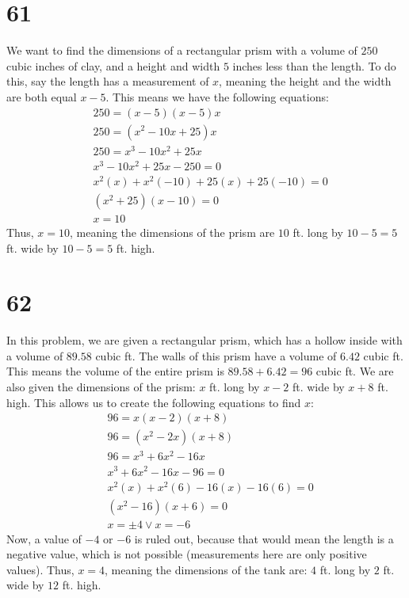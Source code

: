 \documentclass{article}
\theoremstyle{definition}
\begin{document}
\section*{61}


We want to find the dimensions of a rectangular prism with a volume of $250$ cubic inches of clay, and a height and width $5$ inches less than the length. To do this, 
say the length has a measurement of $x$, meaning the height and the width are both equal $x-5$. This means we have the following equations:
\[
\begin{array}{rl}
	& 250=(x-5)(x-5)x \\
	& 250=(x^2-10x+25)x \\
	& 250=x^3-10x^2+25x \\
	& x^3-10x^2+25x-250=0 \\
	& x^2(x)+x^2(-10)+25(x)+25(-10)=0 \\
	& (x^2+25)(x-10)=0 \\
	& x=10
\end{array}
\]
Thus, $x=10$, meaning the dimensions of the prism are $10$ ft. long by $10-5=5$ ft. wide by $10-5=5$ ft. high.

\section*{62}


In this problem, we are given a rectangular prism, which has a hollow inside with a volume of $89.58$ cubic ft. The walls of this prism have a volume of $6.42$ cubic ft. 
This means the volume of the entire prism is $89.58+6.42=96$ cubic ft. We are also given the dimensions of the prism: $x$ ft. long by $x-2$ ft. wide by $x+8$ ft. high. 
This allows us to create the following equations to find $x$:
\[
\begin{array}{rl}
	& 96=x(x-2)(x+8) \\
	& 96=(x^2-2x)(x+8) \\
	& 96=x^3+6x^2-16x \\
	& x^3+6x^2-16x-96=0 \\
	& x^2(x)+x^2(6)-16(x)-16(6)=0 \\
	& (x^2-16)(x+6)=0 \\
	& x=\pm 4\vee x=-6
\end{array}
\]
Now, a value of $-4$ or $-6$ is ruled out, because that would mean the length is a negative value, which is not possible (measurements here are only positive values). Thus, $x=4$, meaning the dimensions of the tank are: $4$ ft. long by $2$ ft. wide by $12$ ft. high.
\end{document}
